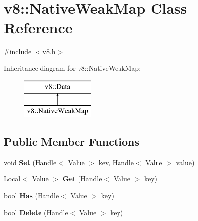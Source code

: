 \hypertarget{classv8_1_1_native_weak_map}{}\section{v8\+:\+:Native\+Weak\+Map Class Reference}
\label{classv8_1_1_native_weak_map}


{\ttfamily \#include $<$v8.\+h$>$}

Inheritance diagram for v8\+:\+:Native\+Weak\+Map\+:\begin{figure}[H]
\begin{center}
\leavevmode
\includegraphics[height=2.000000cm]{classv8_1_1_native_weak_map}
\end{center}
\end{figure}
\subsection*{Public Member Functions}
\begin{DoxyCompactItemize}
\item 
\hypertarget{classv8_1_1_native_weak_map_a106360c021729da2940d57a436323e52}{}void {\bfseries Set} (\hyperlink{classv8_1_1_handle}{Handle}$<$ \hyperlink{classv8_1_1_value}{Value} $>$ key, \hyperlink{classv8_1_1_handle}{Handle}$<$ \hyperlink{classv8_1_1_value}{Value} $>$ value)\label{classv8_1_1_native_weak_map_a106360c021729da2940d57a436323e52}

\item 
\hypertarget{classv8_1_1_native_weak_map_a65715f9678e9286c3ff63b4a2084810d}{}\hyperlink{classv8_1_1_local}{Local}$<$ \hyperlink{classv8_1_1_value}{Value} $>$ {\bfseries Get} (\hyperlink{classv8_1_1_handle}{Handle}$<$ \hyperlink{classv8_1_1_value}{Value} $>$ key)\label{classv8_1_1_native_weak_map_a65715f9678e9286c3ff63b4a2084810d}

\item 
\hypertarget{classv8_1_1_native_weak_map_ad5c0ca899639c2ec3fcf2b637376bee8}{}bool {\bfseries Has} (\hyperlink{classv8_1_1_handle}{Handle}$<$ \hyperlink{classv8_1_1_value}{Value} $>$ key)\label{classv8_1_1_native_weak_map_ad5c0ca899639c2ec3fcf2b637376bee8}

\item 
\hypertarget{classv8_1_1_native_weak_map_ab590e91a69e949dfca6cdc64294282c3}{}bool {\bfseries Delete} (\hyperlink{classv8_1_1_handle}{Handle}$<$ \hyperlink{classv8_1_1_value}{Value} $>$ key)\label{classv8_1_1_native_weak_map_ab590e91a69e949dfca6cdc64294282c3}

\end{DoxyCompactItemize}
